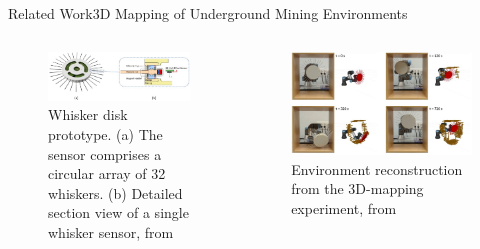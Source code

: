 \documentclass[AIRbeamer
,optEnglish
,optBiber
,optBibstyleAlphabetic
,optBeamerClassicFormat%
]{AIRlatex}
\begin{document}
    \begin{frame}[c]{Related Work}{3D Mapping of Underground Mining Environments}
        \begin{columns}[T,onlytextwidth]
            \begin{column}[T]{0.48\textwidth}
                \begin{figure}[H]
                    \centering
                    \includegraphics[width=\textwidth]{figures/related-works-1-prototype}
                    \caption{Whisker disk prototype. (a) The sensor comprises a circular array of 32 whiskers. (b) Detailed section view of a single whisker sensor, from~\cite{biomimetics9020083}}
                \end{figure}
            \end{column}
            \begin{column}[T]{0.48\textwidth}
                \begin{figure}[H]
                    \centering
                    \includegraphics[width=\textwidth]{figures/related-works-1-results}
                    \caption{Environment reconstruction from the 3D-mapping experiment, from ~\cite{biomimetics9020083}}
                \end{figure}
            \end{column}
        \end{columns}
    \end{frame}
\end{document}
